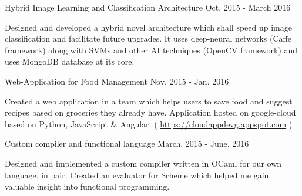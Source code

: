 

\begin{cventries}
	
	
	\cvmyentry
	{Hybrid Image Learning and Classification Architecture} %
	{\vspace{-2.0mm} Oct. 2015 - March 2016} %
	{	\vspace*{-\baselineskip} \vspace{+2.0mm}
	\begin{cvitems} %
		Designed and developed a hybrid novel architecture which shall speed up image classification and facilitate future upgrades. It uses deep-neural networks (Caffe framework) along with SVMs and other AI techniques (OpenCV framework) and uses MongoDB database at its core. 
	\end{cvitems}
	}
	

	
	
	\cvmyentry
	{Web-Application for Food Management} %
	{\vspace{-2.0mm} Nov. 2015 - Jan. 2016} %
	{	\vspace*{-\baselineskip} \vspace{+2.0mm}
		\begin{cvitems} %
			Created a web application in a team which helps users to save food and suggest recipes based on groceries they already have. Application hosted on google-cloud based on Python, JavaScript & Angular. (
				 \url{https://cloudappdevg.appspot.com}
				 )
		\end{cvitems}
	}
	
	
	
	
	\cvmyentry
	{Custom compiler and functional language} %
	{\vspace{-2.0mm} March. 2015 - June. 2016} %
	{	\vspace*{-\baselineskip} \vspace{+2.0mm}
		\begin{cvitems} %
			Designed and implemented a custom compiler written in OCaml for our own language, in pair. Created an evaluator for Scheme which helped me gain valuable insight into functional programming.
		\end{cvitems}
	}
	

\end{cventries}
